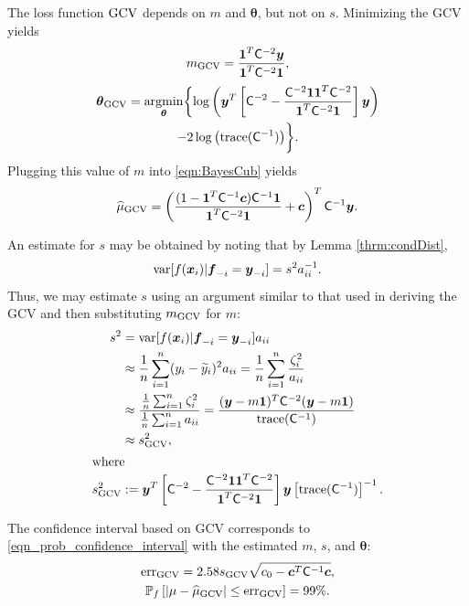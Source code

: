 \documentclass[twocolumn]{svjour3}          %
\newcommand{\bm}[1]{\boldsymbol{#1}}
\newcommand{\trace}[1]{\textup{trace}{#1}}
\newcommand{\vtheta}{{\bm{\theta}}}
\newcommand{\vc}{\bm{c}}
\newcommand{\vf}{\bm{f}}
\newcommand{\vx}{\bm{x}}
\newcommand{\vy}{\bm{y}}
\newcommand{\vone}{\bm{1}}
\newcommand{\mC}{\mathsf{C}}
\newcommand{\var}{{\textup{var}}}
\newcommand{\hmu}{\widehat{\mu}}
\newcommand{\err}{\textup{err}}
\providecommand{\argmin}{\operatorname*{argmin}}
\begin{document}
The loss function $\textup{GCV}$ depends on $m$ and $\vtheta$, but not on $s$.  Minimizing the GCV  yields
\begin{align*}
m_{\textup{GCV}} = \frac{\vone^T \mC^{-2} \vy}{\vone^T \mC^{-2} \vone},\\ 
\end{align*}
\begin{multline}
\label{vthetaGCV}
\vtheta_{\textup{GCV}} = \argmin_\vtheta \biggl\{\log \left(  \vy^T \left[\mC^{-2} - \frac{\mC^{-2} \vone \vone^T \mC^{-2}}{\vone^T \mC^{-2} \vone}  \right] \vy \right)  \\
- 2 \log \left ( \trace(\mC^{-1}) \right ) \biggr\} .
\end{multline}
Plugging this value of $m$ into \eqref{eqn:BayesCub} yields
\begin{align}
\label{eqn:muCV}
\widehat{\mu}_{\textup{GCV}}
= \left(\frac{(1 - \vone^T  \mC^{-1}\vc) \mC^{-1} \vone}{\vone^T \mC^{-2} \vone} + \vc \right)^T \mC^{-1} \vy.
\end{align}

An estimate for $s$ may be obtained by noting that by Lemma \ref{thrm:condDist},
\begin{align*}
\var[f(\vx_i ) | \vf_{-i} = \vy_{-i}] = s^2 a_{ii}^{-1}.
\end{align*}
Thus, we may estimate $s$ using an argument similar to that used in deriving the GCV and then substituting $m_{\textup{GCV}}$ for $m$:
\begin{align*}
s^2 &= \var[f(\vx_i ) | \vf_{-i} = \vy_{-i}] a_{ii} \\ 
& \approx \frac 1n \sum_{i=1}^n (y_i - \widetilde{y}_i)^2a_{ii}
 = \frac 1n \sum_{i=1}^n \frac{\zeta_i^2}{a_{ii}} \\ 
 & \approx \frac{ \frac 1n \sum_{i=1}^n \zeta_i^2}{\frac 1n \sum_{i=1}^n a_{ii} } = \frac{(\vy - m\vone)^T \mC^{-2} (\vy - m \vone)}{ \trace(\mC^{-1}) } \\ 
 & \approx  s^2_{\textup{GCV}}, \\
 \intertext{where}
 s^2_{\textup{GCV}} & : = \vy^T \left[\mC^{-2} - \frac{\mC^{-2} \vone \vone^T \mC^{-2}}{\vone^T \mC^{-2} \vone}  \right] \vy  \left[ \trace(\mC^{-1}) \right]^{-1}. 
\end{align*}

The confidence interval based on GCV corresponds to \eqref{eqn_prob_confidence_interval} with the estimated $m$, $s$, and $\vtheta$:
\begin{gather}
\label{GCVerr}
\err_{\textup{GCV}} = 2.58 s_{\textup{GCV}}  \sqrt{c_0 - \vc^T\mC^{-1}\vc}, \\
\label{GCVCI}
\mathbb{P}_f \left[
|\mu-\hmu_{\textup{GCV}}| \leq \err_{\textup{GCV}} 
\right] = 99\%.
\end{gather}
\end{document}
